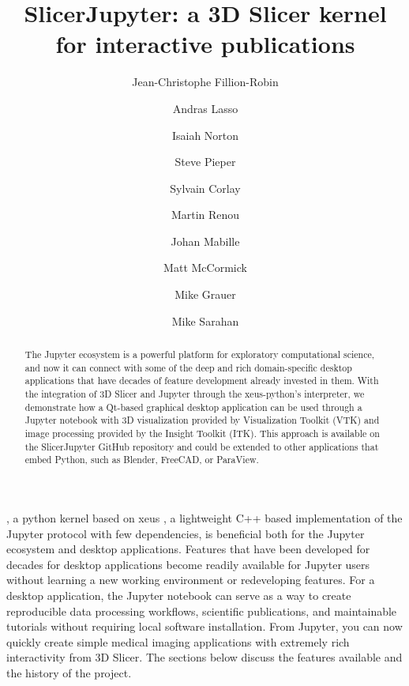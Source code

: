 \documentclass{IEEEcsmag}
\begin{document}

\title{SlicerJupyter: a 3D Slicer kernel for interactive publications}

\author{Jean-Christophe Fillion-Robin}

\author{Andras Lasso}

\author{Isaiah Norton}

\author{Steve Pieper}

\author{Sylvain Corlay}

\author{Martin Renou}

\author{Johan Mabille}

\author{Matt McCormick}

\author{Mike Grauer}

\author{Mike Sarahan}


\begin{abstract}
The Jupyter ecosystem is a powerful platform for exploratory computational science, and now it can connect with some of the deep and rich domain-specific desktop applications that have decades of feature development already invested in them. With the integration of 3D Slicer and Jupyter through the xeus-python’s interpreter, we demonstrate how a Qt-based graphical desktop application can be used through a Jupyter notebook with 3D visualization provided by Visualization Toolkit (VTK) and image processing provided by the Insight Toolkit (ITK). This approach is available on the SlicerJupyter GitHub repository and could be extended to other applications that embed Python, such as Blender, FreeCAD, or ParaView.
\end{abstract}

\maketitle


, a python kernel based on xeus \cite{xeus}, a lightweight C++ based implementation of the Jupyter protocol with few dependencies, is beneficial both for the Jupyter ecosystem and desktop applications. Features that have been developed for decades for desktop applications become readily available for Jupyter users without learning a new working environment or redeveloping features. For a desktop application, the Jupyter notebook \cite{Kluyver:2016aa} can serve as a way to create reproducible data processing workflows, scientific publications, and maintainable tutorials without requiring local software installation. From Jupyter, you can now quickly create simple medical imaging applications with extremely rich interactivity from 3D Slicer. The sections below discuss the features available and the history of the project.
\end{document}

